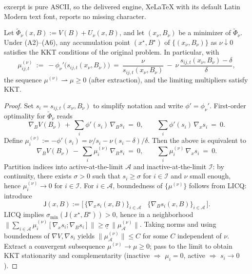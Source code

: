 \documentclass[10pt,a4paper]{amsart}
\begin{document}
excerpt is pure ASCII, so the delivered engine, XeLaTeX with its default Latin Modern text font, reports no missing character.
\begin{corollary}\label{cor:Unu-KKT}
Let $\widetilde{\Phi}_\nu(x,B):=V(B)+U_\nu(x,B)$, and let $(x_\nu,B_\nu)$ be a minimizer of $\widetilde{\Phi}_\nu$. Under (A2)--(A6), any accumulation point $(x^\star,B^\star)$ of $\{(x_\nu,B_\nu)\}$ as $\nu\downarrow 0$ satisfies the KKT conditions of the original problem. In particular, with
\[
\mu^{(\nu)}_{ij,t}\ :=\ -\phi_\nu'\!\bigl(s_{ij,t}(x_\nu,B_\nu)\bigr)\ =\ \frac{\nu}{s_{ij,t}(x_\nu,B_\nu)}\ -\ \nu\,\frac{s_{ij,t}(x_\nu,B_\nu)-\delta}{\delta},
\]
the sequence $\mu^{(\nu)}\rightharpoonup \mu\ge 0$ (after extraction), and the limiting multipliers satisfy KKT.
\end{corollary}

\begin{proof}
Set $s_i=s_{ij,t}(x_\nu,B_\nu)$ to simplify notation and write $\phi'=\phi_\nu'$. First-order optimality for $\widetilde{\Phi}_\nu$ reads
\[
\nabla_B V(B_\nu)\ +\ \sum_i \phi'(s_i)\,\nabla_B s_i\ =\ 0,\qquad
\sum_i \phi'(s_i)\,\nabla_x s_i\ =\ 0.
\]
Define $\mu_i^{(\nu)}:=-\phi'(s_i)=\nu/s_i - \nu(s_i-\delta)/\delta$. Then the above is equivalent to
\[
\nabla_B V(B_\nu)\ -\ \sum_i \mu_i^{(\nu)}\,\nabla_B s_i\ =\ 0,\qquad
\sum_i \mu_i^{(\nu)}\,\nabla_x s_i\ =\ 0.
\]
Partition indices into active-at-the-limit $\mathcal{A}$ and inactive-at-the-limit $\mathcal{I}$: by continuity, there exists $\sigma>0$ such that $s_i\ge \sigma$ for $i\in\mathcal{I}$ and $\nu$ small enough, hence $\mu_i^{(\nu)}\to 0$ for $i\in\mathcal{I}$. For $i\in\mathcal{A}$, boundedness of $\{\mu^{(\nu)}\}$ follows from LICQ: introduce
\[
\mathsf{J}(x,B):=\bigl[\, \{\nabla_x s_i(x,B)\}_{i\in\mathcal{A}}\ \ \ \ \{\nabla_B s_i(x,B)\}_{i\in\mathcal{A}} \,\bigr].
\]
LICQ implies $\sigma_{\min}(\mathsf{J}(x^\star,B^\star))>0$, hence in a neighborhood $\|\sum_{i\in\mathcal{A}} \mu_i^{(\nu)}[\nabla_x s_i;\nabla_B s_i]\|\ge \underline{\sigma}\,\|\mu_{\mathcal{A}}^{(\nu)}\|$. Taking norms and using boundedness of $\nabla V,\nabla s_i$ yields $\|\mu_{\mathcal{A}}^{(\nu)}\|\le C$ for some $C$ independent of $\nu$. Extract a convergent subsequence $\mu^{(\nu)}\to\mu\ge 0$; pass to the limit to obtain KKT stationarity and complementarity (inactive $\Rightarrow$ $\mu_i=0$, active $\Rightarrow$ $s_i\to 0$). 
\end{proof}
\end{document}

